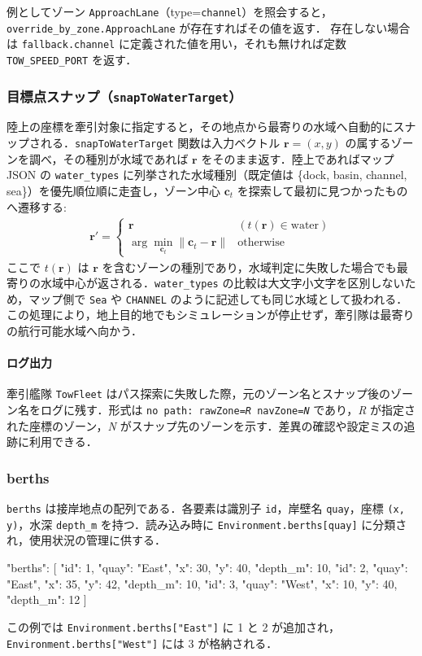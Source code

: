 \documentclass[10pt,letterpaper]{jsarticle}
\begin{document}
例としてゾーン \texttt{ApproachLane}（type=\texttt{channel}）を照会すると，\texttt{override\_by\_zone.ApproachLane} が存在すればその値を返す．
存在しない場合は \texttt{fallback.channel} に定義された値を用い，それも無ければ定数 \texttt{TOW\_SPEED\_PORT} を返す．

\subsubsection{目標点スナップ（\texttt{snapToWaterTarget}）}
陸上の座標を牽引対象に指定すると，その地点から最寄りの水域へ自動的にスナップされる．\texttt{snapToWaterTarget} 関数は入力ベクトル $\boldsymbol{r} = (x, y)$ の属するゾーンを調べ，その種別が水域であれば $\boldsymbol{r}$ をそのまま返す．陸上であればマップ JSON の \texttt{water\_types} に列挙された水域種別（既定値は \{dock, basin, channel, sea\}）を優先順位順に走査し，ゾーン中心 $\boldsymbol{c}_t$ を探索して最初に見つかったものへ遷移する:
\begin{align}
    \boldsymbol{r}' = \begin{cases}
    \boldsymbol{r} & (t(\boldsymbol{r}) \in \text{water}) \\
    \arg\min_{\boldsymbol{c}_t} \|\boldsymbol{c}_t - \boldsymbol{r}\| & \text{otherwise}
  \end{cases}
\end{align}
ここで $t(\boldsymbol{r})$ は $\boldsymbol{r}$ を含むゾーンの種別であり，水域判定に失敗した場合でも最寄りの水域中心が返される．\texttt{water\_types} の比較は大文字小文字を区別しないため，マップ側で \texttt{Sea} や \texttt{CHANNEL} のように記述しても同じ水域として扱われる．この処理により，地上目的地でもシミュレーションが停止せず，牽引隊は最寄りの航行可能水域へ向かう．

\paragraph{ログ出力}
牽引艦隊 \texttt{TowFleet} はパス探索に失敗した際，元のゾーン名とスナップ後のゾーン名をログに残す．形式は \texttt{no path: rawZone=\textit{R} navZone=\textit{N}} であり，\textit{R} が指定された座標のゾーン，\textit{N} がスナップ先のゾーンを示す．差異の確認や設定ミスの追跡に利用できる．

\subsubsection{berths}
\texttt{berths} は接岸地点の配列である．各要素は識別子 \texttt{id}，岸壁名 \texttt{quay}，座標 \texttt{(x, y)}，水深 \texttt{depth\_m} を持つ．読み込み時に \texttt{Environment.berths[quay]} に分類され，使用状況の管理に供する．
\begin{jsoncode}
"berths": [
  {"id": 1, "quay": "East", "x": 30, "y": 40, "depth_m": 10},
  {"id": 2, "quay": "East", "x": 35, "y": 42, "depth_m": 10},
  {"id": 3, "quay": "West", "x": 10, "y": 40, "depth_m": 12}
]
\end{jsoncode}
この例では \texttt{Environment.berths["East"]} に 1 と 2 が追加され，\texttt{Environment.berths["West"]} には 3 が格納される．
\end{document}
